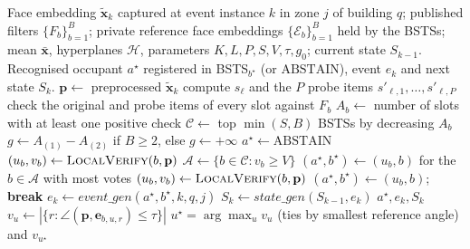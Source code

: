 \documentclass[pdflatex,sn-mathphys-num]{sn-jnl}%
\theoremstyle{thmstyleone}%
\theoremstyle{thmstyletwo}%
\theoremstyle{thmstylethree}%
\begin{document}
\begin{algorithm}[!t]
\small
\caption{Adaptive candidate routing, event generation and state generation}
\label{alg:adaptive-routing}
\begin{algorithmic}[1]
\Require Face embedding $\tilde{\mathbf{x}}_k$ captured at event instance $k$ in zone $j$ of building $q$;
\Statex published filters $\{F_b\}_{b=1}^{B}$; private reference face embeddings $\{\mathcal{E}_b\}_{b=1}^{B}$ held by the BSTSs;
\Statex mean $\bar{\mathbf{x}}$, hyperplanes $\mathcal{H}$, parameters $K,L,P,S,V,\tau,g_0$;
\Statex current state $S_{k-1}$.
\Ensure Recognised occupant $a^\star$ registered in BSTS$_{b^\star}$ (or $\mathrm{ABSTAIN}$), event $e_k$ and next state $S_k$.
\State $\mathbf{p}\gets$ preprocessed $\tilde{\mathbf{x}}_k$ 
  \State compute $s_\ell$ and the $P$ probe items $s'_{\ell,1},\dots,s'_{\ell,P}$ 
\EndFor
{}
  \State check the original and probe items of every slot against $F_b$
  \State $A_b\gets$ number of slots with at least one positive check 
\EndFor
\State $\mathcal{C}\gets$ top $\min(S,B)$ BSTSs by decreasing $A_b$ 
\State $g\gets A_{(1)}-A_{(2)}$ if $B\geq2$, else $g\gets+\infty$
\State $a^\star\gets\mathrm{ABSTAIN}$
 
    \State $(u_b,v_b)\gets\textsc{LocalVerify}(b,\mathbf{p})$
  \EndFor
  \State $\mathcal{A}\gets\{b\in\mathcal{C}:v_b\geq V\}$
   \State $(a^\star,b^\star)\gets(u_b,b)$ for the $b\in\mathcal{A}$ with most votes  \EndIf
\Else {}
    \State $(u_b,v_b)\gets\textsc{LocalVerify}(b,\mathbf{p})$
     \State $(a^\star,b^\star)\gets(u_b,b)$; \textbf{break} \EndIf
  \EndFor
\EndIf
\State $e_k\gets\textit{event\_gen}(a^\star,b^\star,k,q,j)$ 
\State $S_k\gets\textit{state\_gen}(S_{k-1},e_k)$ 
\State \Return $a^\star,e_k,S_k$
 
    \State $v_u\gets|\{r:\angle(\mathbf{p},\mathbf{e}_{b,u,r})\leq\tau\}|$
  \EndFor
  \State \Return $u^\star=\arg\max_u v_u$ (ties by smallest reference angle) and $v_{u^\star}$
\EndFunction
\end{algorithmic}
\end{algorithm}
\end{document}
